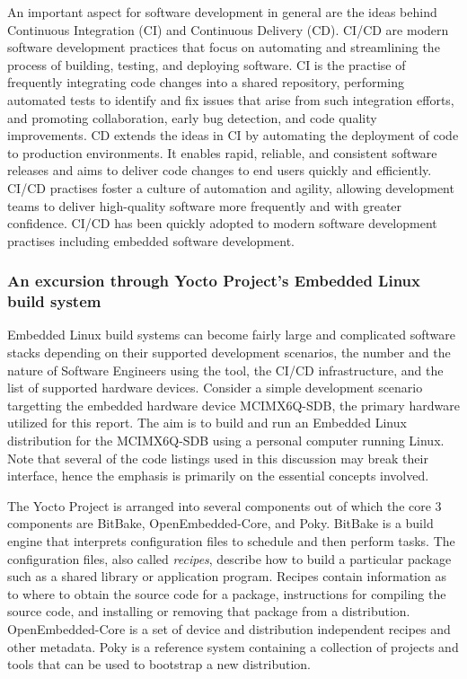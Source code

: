 An important aspect for software development in general are the ideas behind Continuous Integration (CI) and Continuous Delivery (CD). CI/CD are modern software development practices that focus on automating and streamlining the process of building, testing, and deploying software. CI is the practise of frequently integrating code changes into a shared repository, performing automated tests to identify and fix issues that arise from such integration efforts, and promoting collaboration, early bug detection, and code quality improvements. CD extends the ideas in CI by automating the deployment of code to production environments. It enables rapid, reliable, and consistent software releases and aims to deliver code changes to end users quickly and efficiently. CI/CD practises foster a culture of automation and agility, allowing development teams to deliver high-quality software more frequently and with greater confidence. CI/CD has been quickly adopted to modern software development practises including embedded software development.

\subsubsection{An excursion through Yocto Project's Embedded Linux build system}

Embedded Linux build systems can become fairly large and complicated software stacks depending on their supported development scenarios, the number and the nature of Software Engineers using the tool, the CI/CD infrastructure, and the list of supported hardware devices. Consider a simple development scenario targetting the embedded hardware device MCIMX6Q-SDB, the primary hardware utilized for this report. The aim is to build and run an Embedded Linux distribution for the MCIMX6Q-SDB using a personal computer running Linux. Note that several of the code listings used in this discussion may break their interface, hence the emphasis is primarily on the essential concepts involved.

The Yocto Project is arranged into several components out of which the core 3 components are BitBake, OpenEmbedded-Core, and Poky. BitBake is a build engine that interprets configuration files to schedule and then perform tasks. The configuration files, also called  \textit{recipes}, describe how to build a particular package such as a shared library or application program. Recipes contain information as to where to obtain the source code for a package, instructions for compiling the source code, and installing or removing that package from a distribution. OpenEmbedded-Core is a set of device and distribution independent recipes and other metadata. Poky is a reference system containing a collection of projects and tools that can be used to bootstrap a new distribution.


